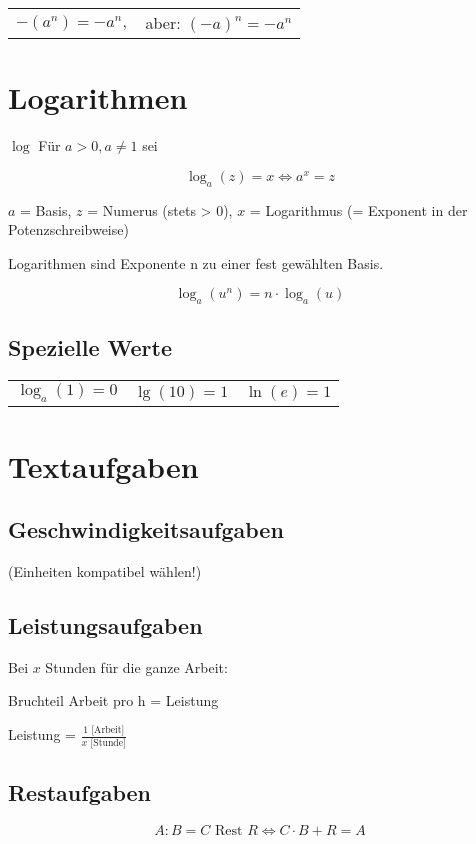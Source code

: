 \begin{multicols}{2}
\begin{tabular}{cc}
 $-(a^n) = -a^n,$ & aber: $(-a)^n = -a^n$\\
 \end{tabular} 


\section{Logarithmen}

\begin{definition}{$\log$}{}
Für $a>0, a\ne 1$ sei

$$\log_a{}(z)=x \Longleftrightarrow{} a^x = z$$
\end{definition}
$a$ = Basis, $z$ = Numerus (stets > 0), $x$ = Logarithmus (= Exponent in der Potenzschreibweise)

Logarithmen sind Exponente n zu einer fest gewählten Basis.

\begin{gesetz}{}{}
$$\log_a(u^n) = n\cdot{}\log_a(u)$$
\end{gesetz}

\subsection{Spezielle Werte}
\begin{tabular}{ccc}
$\log_a(1)=0$ & $\lg(10) = 1$ & $\ln(e) = 1$
\end{tabular} 

\section{Textaufgaben}

\subsection{Geschwindigkeitsaufgaben}
 (Einheiten kompatibel wählen!)

\subsection{Leistungsaufgaben}
Bei $x$ Stunden für die ganze Arbeit:

Bruchteil Arbeit pro h = Leistung

Leistung = $\frac{1 \textrm{ [Arbeit]}}{x \textrm{ [Stunde]}}$

\subsection{Restaufgaben}
$$A:B = C \textrm{ Rest } R \Longleftrightarrow{}  C\cdot{}B+R = A$$


\end{multicols}
